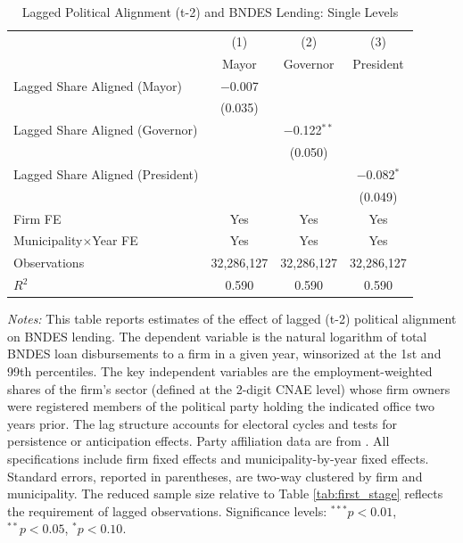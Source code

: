 \documentclass{article}
\begin{document}
\begin{table}[H]
    \centering
    \caption{Lagged Political Alignment (t-2) and BNDES Lending: Single Levels}
    \label{tab:lagged_single}
    \begin{threeparttable}
        \begin{tabular}{lccc}
            \toprule
                                             & (1)        & (2)             & (3)            \\
                                             & Mayor      & Governor        & President      \\
            \midrule
            Lagged Share Aligned (Mayor)     & $-$0.007   &                 &                \\
                                             & (0.035)    &                 &                \\
            Lagged Share Aligned (Governor)  &            & $-$0.122$^{**}$ &                \\
                                             &            & (0.050)         &                \\
            Lagged Share Aligned (President) &            &                 & $-$0.082$^{*}$ \\
                                             &            &                 & (0.049)        \\
            \midrule
            Firm FE                          & Yes        & Yes             & Yes            \\
            Municipality$\times$Year FE      & Yes        & Yes             & Yes            \\
            \midrule
            Observations                     & 32,286,127 & 32,286,127      & 32,286,127     \\
            $R^2$                            & 0.590      & 0.590           & 0.590          \\
            \bottomrule
        \end{tabular}
        \begin{tablenotes}
            \small
            \item \textit{Notes:} This table reports estimates of the effect of lagged (t-2) political alignment on BNDES lending. The dependent variable is the natural logarithm of total BNDES loan disbursements to a firm in a given year, winsorized at the 1st and 99th percentiles. The key independent variables are the employment-weighted shares of the firm's sector (defined at the 2-digit CNAE level) whose firm owners were registered members of the political party holding the indicated office two years prior. The lag structure accounts for electoral cycles and tests for persistence or anticipation effects. Party affiliation data are from \citet{colonnelli2025politics}. All specifications include firm fixed effects and municipality-by-year fixed effects. Standard errors, reported in parentheses, are two-way clustered by firm and municipality. The reduced sample size relative to Table \ref{tab:first_stage} reflects the requirement of lagged observations. Significance levels: $^{***}p<0.01$, $^{**}p<0.05$, $^{*}p<0.10$.

\end{tablenotes}
\end{threeparttable}
\end{table}
\end{document}
